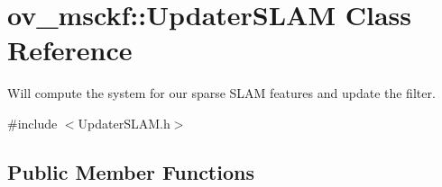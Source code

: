 \hypertarget{classov__msckf_1_1UpdaterSLAM}{}\section{ov\+\_\+msckf\+:\+:Updater\+S\+L\+AM Class Reference}
\label{classov__msckf_1_1UpdaterSLAM}


Will compute the system for our sparse S\+L\+AM features and update the filter.  




{\ttfamily \#include $<$Updater\+S\+L\+A\+M.\+h$>$}

\subsection*{Public Member Functions}
